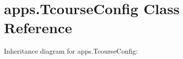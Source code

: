 \hypertarget{classapps_1_1_tcourse_config}{}\section{apps.\+Tcourse\+Config Class Reference}
\label{classapps_1_1_tcourse_config}


Inheritance diagram for apps.\+Tcourse\+Config\+:
